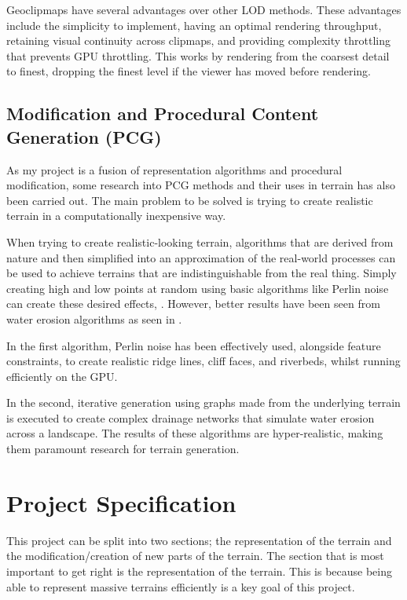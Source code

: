 \documentclass[notitlepage,12pt]{article}
\begin{document}
Geoclipmaps have several advantages over other LOD methods. These advantages include the simplicity to implement, having an optimal rendering throughput, retaining visual continuity across clipmaps, and providing complexity throttling that prevents GPU throttling. This works by rendering from the coarsest detail to finest, dropping the finest level if the viewer has moved before rendering.

\subsection{Modification and Procedural Content Generation (PCG)} \label{pcg}

As my project is a fusion of representation algorithms and procedural modification, some research into PCG methods and their uses in terrain has also been carried out. The main problem to be solved is trying to create realistic terrain in a computationally inexpensive way.

When trying to create realistic-looking terrain, algorithms that are derived from nature and then simplified into an approximation of the real-world processes can be used to achieve terrains that are indistinguishable from the real thing. Simply creating high and low points at random using basic algorithms like Perlin noise can create these desired effects, \cite{perlin}. However, better results have been seen from water erosion algorithms as seen in \cite{hydrology}.

In the first algorithm, Perlin noise has been effectively used, alongside feature constraints, to create realistic ridge lines, cliff faces, and riverbeds, whilst running efficiently on the GPU. 

In the second, iterative generation using graphs made from the underlying terrain is executed to create complex drainage networks that simulate water erosion across a landscape. The results of these algorithms are hyper-realistic, making them paramount research for terrain generation.

\section{Project Specification}

This project can be split into two sections; the representation of the terrain and the modification/creation of new parts of the terrain. The section that is most important to get right is the representation of the terrain. This is because being able to represent massive terrains efficiently is a key goal of this project.
\end{document}
